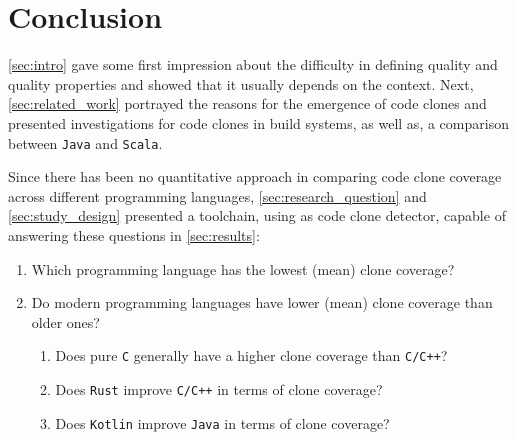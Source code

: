 
\section{Conclusion}
\label{sec:conclusion}

\autoref{sec:intro} gave some first impression about the difficulty in defining quality and quality properties and showed that it usually depends on the context. Next, \autoref{sec:related_work} portrayed the reasons for the emergence of code clones and presented investigations for code clones in build systems, as well as, a comparison between \texttt{Java} and \texttt{Scala}.

Since there has been no quantitative approach in comparing code clone coverage across different programming languages, \autoref{sec:research_question} and \autoref{sec:study_design} presented a toolchain, using \teamscale{} as code clone detector, capable of answering these questions in \autoref{sec:results}:
\begin{enumerate}
	\item Which programming language has the lowest (mean) clone coverage?
	
	
	\item Do modern programming languages have lower (mean) clone coverage than older ones?
	
	
	\begin{enumerate}
		\item Does pure \texttt{C} generally have a higher clone coverage than \texttt{C/C++}?
		
		
		\item Does \texttt{Rust} improve \texttt{C/C++} in terms of clone coverage?
		
		
		\item Does \texttt{Kotlin} improve \texttt{Java} in terms of clone coverage?
		
	\end{enumerate}
\end{enumerate}

